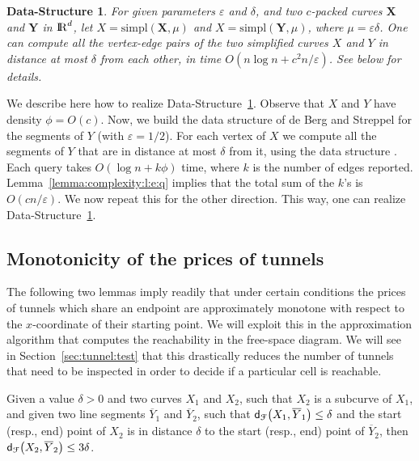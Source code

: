 \documentclass[12pt]{article}
\newtheorem{datastructure}[theorem]{Data-Structure}
\providecommand{\si}[1]{#1}
\newcommand{\secref}[1]{Section~\ref{sec:#1}}
\newcommand{\lemlab}[1]{\label{lemma:#1}}
\newcommand{\lemref}[1]{Lemma~\ref{lemma:#1}}
\newcommand{\dsref}[1]{Data-Structure~\ref{ds:#1}}
\newcommand{\dslab}[1]{\label{ds:#1}}
\newcommand{\distFr}[2]{\mathsf{d}_{\EuScript{F}}\pth{#1, #2}}
\newcommand{\SimplifyX}[1]{#1}
\newcommand{\SubCurvifyY}[1]{{#1}}
\newcommand{\cXBase}{X} \newcommand{\cYBase}{Y} \newcommand{\crvCBase}{{\pi}}
\newcommand{\cX}{\SimplifyX{\cXBase}}
\newcommand{\cXOrig}{\pmb{\cXBase}}
\newcommand{\subcX}[1]{\SubCurvifyY{\cX}_{#1}}
\newcommand{\cY}{\SimplifyX{\cYBase}}
\newcommand{\cYOrig}{\pmb{\cYBase}}
\newcommand{\subsegY}[1]{\overline{\cY}_{#1}}
\providecommand{\pth}[2][\!]{#1\left({#2}\right)}
\newcommand{\sRadius}{\mu}
\providecommand{\eps}{{\varepsilon}}\renewcommand{\Re}{{\rm I\!\hspace{-0.025em} R}}
\newcommand{\density}{\phi}
\newcommand{\simpX}[1]{\mathrm{s{i}m{p}l}\pth{#1}}
\newcommand{\constSC}{3}
\numberwithin{figure}{section}
\numberwithin{equation}{section}
\begin{document}
\begin{datastructure}
    \dslab{d:s:magic:A}For given parameters $\eps$ and $\delta$, and two $c$-packed
    curves $\cXOrig$ and $\cYOrig$ in $\Re^d$, let $\cX =
    \simpX{\cXOrig, \sRadius}$ and $\cX = \simpX{\cYOrig, \sRadius}$,
    where $\sRadius = \eps \delta$.  One can compute all the
    vertex-edge pairs of the two simplified curves $\cX$ and $\cY$ in
    distance at most $\delta$ from each other, in time $O( n \log n +
    c^2n / \eps )$. See below for details.
\end{datastructure}








We describe here how to realize \dsref{d:s:magic:A}.  Observe that
$\cX$ and $\cY$ have density $\density = O( c)$.  Now, we build the
data structure of \si{de Berg} and Streppel \cite{bs-arsbsp-06} for
the segments of $\cY$ (with $\eps=1/2$). For each vertex of $\cX$ we
compute all the segments of $\cY$ that are in distance at most
$\delta$ from it, using the data structure \cite{bs-arsbsp-06}. Each
query takes $O( \log n + k \density)$ time, where $k$ is the number of
edges reported.  \lemref{complexity:l:e:q} implies that the total sum
of the $k$'s is $O( c n /\eps)$.  We now repeat this for the other
direction. This way, one can realize \dsref{d:s:magic:A}.




\subsection{Monotonicity of the prices of tunnels}

The following two lemmas imply readily that under certain conditions
the prices of tunnels which share an endpoint are approximately
monotone with respect to the $x$-coordinate of their starting
point. We will exploit this in the approximation algorithm that
computes the reachability in the free-space diagram. We will see in
\secref{tunnel:test} that this drastically reduces the number of
tunnels that need to be inspected in order to decide if a particular
cell is reachable.

\begin{lemma}\lemlab{monotone:shortcut:base}Given a value $\delta > 0$ and two curves $\subcX{1}$ and
    $\subcX{2}$, such that $\subcX{2}$ is a subcurve of $\subcX{1}$,
    and given two line segments $\subsegY{1}$ and $\subsegY{2}$, such
    that $\distFr{\subcX{1}}{\subsegY{1}} \leq \delta$ and the start
    (resp., end) point of $\subcX{2}$ is in distance $\delta$ to the
    start (resp., end) point of ${\subsegY{2}}$, then
    $\distFr{\subcX{2}}{\subsegY{2}} \leq \constSC \delta$.
\end{lemma}
\end{document}
